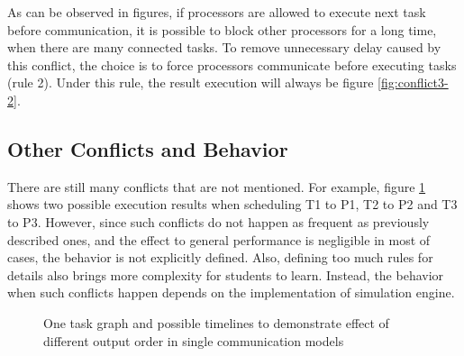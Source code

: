 \documentclass[msc,deptreport, cs]{infthesis}
\begin{document}
As can be observed in figures, if processors are allowed to execute next task before communication, it is possible to block other processors for a long time, when there are many connected tasks. To remove unnecessary delay caused by this conflict, the choice is to force processors communicate before executing tasks (rule 2). Under this rule, the result execution will always be figure \ref{fig:conflict3-2}.

\subsection{Other Conflicts and Behavior}

There are still many conflicts that are not mentioned. For example, figure \ref{fig:conflict4} shows two possible execution results when scheduling T1 to P1, T2 to P2 and T3 to P3. However, since such conflicts do not happen as frequent as previously described ones, and the effect to general performance is negligible in most of cases, the behavior is not explicitly defined. Also, defining too much rules for details also brings more complexity for students to learn. Instead, the behavior when such conflicts happen depends on the implementation of simulation engine.

\begin{figure}[htpb]
  \centering
   \hspace{0.5em}
   \hspace{0.5em}
  \caption{One task graph and possible timelines to demonstrate effect of different output order in single communication models}
  \label{fig:conflict4}
\end{figure}
\end{document}
